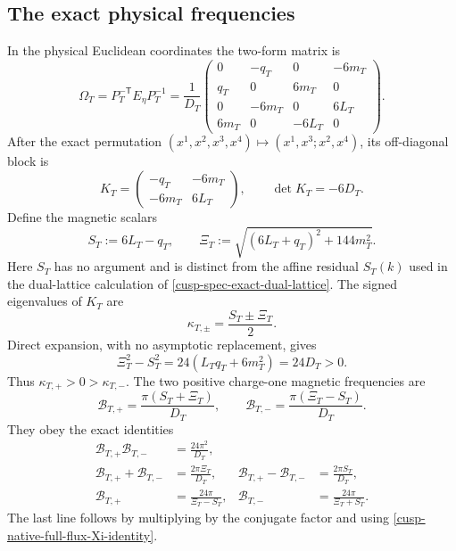 \subsection{The exact physical frequencies}

In the physical Euclidean coordinates the two-form matrix is
\begin{equation}
 \Omega_T=P_T^{-\mathsf T}E_\eta P_T^{-1}
 =\frac1{D_T}
 \begin{pmatrix}
 0&-q_T&0&-6m_T\\
 q_T&0&6m_T&0\\
 0&-6m_T&0&6L_T\\
 6m_T&0&-6L_T&0
 \end{pmatrix}.
 \label{cusp-native-full-flux-physical-matrix}
\end{equation}
After the exact permutation
\((x^1,x^2,x^3,x^4)\mapsto(x^1,x^3;x^2,x^4)\), its off-diagonal block is
\begin{equation}
 K_T=\begin{pmatrix}-q_T&-6m_T\\-6m_T&6L_T\end{pmatrix},
 \qquad \det K_T=-6D_T.
 \label{cusp-native-full-flux-K}
\end{equation}
Define the magnetic scalars
\begin{equation}
 S_T:=6L_T-q_T,
 \qquad
 \Xi_T:=\sqrt{(6L_T+q_T)^2+144m_T^2}.
 \label{cusp-native-full-flux-S-Xi}
\end{equation}
Here \(S_T\) has no argument and is distinct from the affine residual
\(S_T(k)\) used in the dual-lattice calculation of
\cref{cusp-spec-exact-dual-lattice}.  The signed eigenvalues of \(K_T\) are
\begin{equation}
 \kappa_{T,\pm}=\frac{S_T\pm\Xi_T}{2}.
 \label{cusp-native-full-flux-kappas}
\end{equation}
Direct expansion, with no asymptotic replacement, gives
\begin{equation}
 \Xi_T^2-S_T^2
 =24(L_Tq_T+6m_T^2)=24D_T>0.
 \label{cusp-native-full-flux-Xi-identity}
\end{equation}
Thus \(\kappa_{T,+}>0>\kappa_{T,-}\).  The two positive charge-one
magnetic frequencies are
\begin{equation}
 \boxed{
 \mathcal B_{T,+}=\frac{\pi(S_T+\Xi_T)}{D_T},
 \qquad
 \mathcal B_{T,-}=\frac{\pi(\Xi_T-S_T)}{D_T}.}
 \label{cusp-native-full-flux-frequencies}
\end{equation}
They obey the exact identities
\begin{align}
 \mathcal B_{T,+}\mathcal B_{T,-}
 &=\frac{24\pi^2}{D_T},
 \label{cusp-native-full-flux-frequency-product}\\
 \mathcal B_{T,+}+\mathcal B_{T,-}
 &=\frac{2\pi\Xi_T}{D_T},&
 \mathcal B_{T,+}-\mathcal B_{T,-}
 &=\frac{2\pi S_T}{D_T},
 \label{cusp-native-full-flux-frequency-sum-difference}\\
 \mathcal B_{T,+}&=\frac{24\pi}{\Xi_T-S_T},&
 \mathcal B_{T,-}&=\frac{24\pi}{\Xi_T+S_T}.
 \label{cusp-native-full-flux-rationalized-frequencies}
\end{align}
The last line follows by multiplying by the conjugate factor and using
\cref{cusp-native-full-flux-Xi-identity}.

